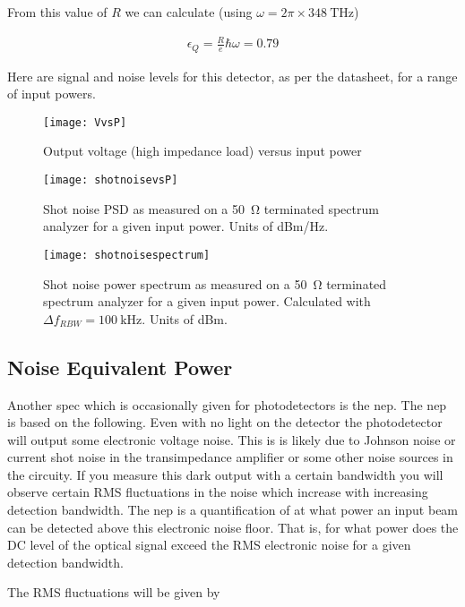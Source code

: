 \documentclass[12pt]{article}
\newcommand{\ep}{\epsilon}
\begin{document}
From this value of $R$ we can calculate (using $\omega = 2\pi \times \SI{348}{\THz}$)

\begin{align}
\ep_Q = \frac{R}{e} \hbar \omega = 0.79
\end{align}

Here are signal and noise levels for this detector, as per the datasheet, for a range of input powers.


\begin{figure}[H]
\centering
\texttt{[image: VvsP]}
\caption{Output voltage (high impedance load) versus input power}
\end{figure}

\begin{figure}[H]
\centering
\texttt{[image: shotnoisevsP]}
\caption{Shot noise PSD as measured on a \SI{50}{\ohm} terminated spectrum analyzer for a given input power. Units of dBm/Hz.}
\label{fig:shotnoisePSD}
\end{figure}

\begin{figure}[H]
\centering
\texttt{[image: shotnoisespectrum]}
\caption{Shot noise power spectrum as measured on a \SI{50}{\ohm} terminated spectrum analyzer for a given input power. Calculated with $\Delta f_{RBW} = \SI{100}{\kilo \hertz}$. Units of dBm.}
\end{figure}

\subsection{Noise Equivalent Power}

Another spec which is occasionally given for photodetectors is the \gls{nep}.
The \gls{nep} is based on the following.
Even with no light on the detector the photodetector will output some electronic voltage noise.
This is is likely due to Johnson noise or current shot noise in the transimpedance amplifier or some other noise sources in the circuity.
If you measure this dark output with a certain bandwidth you will observe certain RMS fluctuations in the noise which increase with increasing detection bandwidth.
The \gls{nep} is a quantification of at what power an input beam can be detected above this electronic noise floor.
That is, for what power does the DC level of the optical signal exceed the RMS electronic noise for a given detection bandwidth.

The RMS fluctuations will be given by
\end{document}
